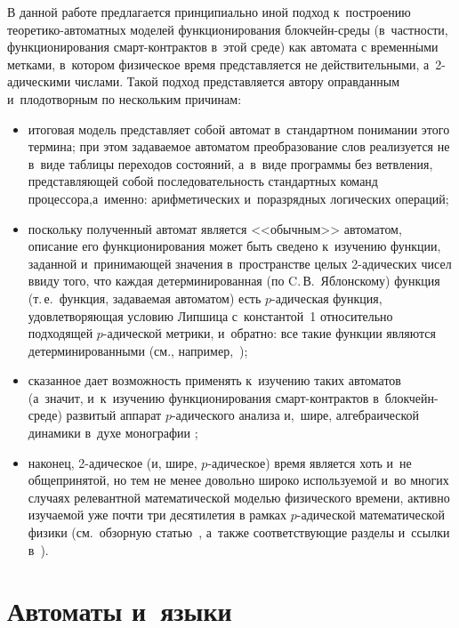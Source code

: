 \begin{multicols}{2}
 В данной работе
предлагается принципиально иной подход к~построению 
тео\-ре\-ти\-ко-ав\-то\-мат\-ных моделей  функционирования блок\-чейн-сре\-ды 
(в~частности,  функционирования
смарт-кон\-трак\-тов в~этой среде) как автомата
с временн$\acute{\mbox{ы}}$ми метками,  в~котором физическое время 
представляется не действительными, а~2-ади\-че\-ски\-ми числами.
Такой подход представляется автору оправданным и~плодотворным по
нескольким причинам:
\begin{itemize}
\item итоговая модель представляет собой автомат в~стандартном понимании
этого термина;
при этом задаваемое
автоматом преобразование слов  реализуется не в~виде таблицы переходов
состояний, а~в~виде программы без вет\-вле\-ния, пред\-став\-ля\-ющей собой
последовательность стандартных команд процессора,\linebreak а~именно:
арифметических и~поразрядных логических операций;
\item поскольку полученный автомат является <<обычным>> автоматом, описание
его функционирования может быть сведено к~изучению функции, заданной и~принимающей
значения в~пространстве целых 2-ади\-че\-ских чисел ввиду того, что каждая детерминированная
(по C.\,В.~Яблонскому)
функция (т.\,е.\ функция, задаваемая автоматом) есть
$p$-ади\-че\-ская функция,
удовлетворяющая  условию Липшица с~константой~1 относительно подходящей $p$-ади\-че\-ской
метрики, и~обратно: все такие функции являются детерминированными 
(см., например,~\cite{me:Discr_Syst});
\item сказанное дает возможность применять к~изуче\-нию таких автоматов
(а~значит, и~к~изуче\-нию функционирования смарт-кон\-трак\-тов в~блок\-чейн-сре\-де) 
развитый аппарат $p$-ади\-че\-ско\-го анализа и,~шире,
алгебраической динамики в~духе монографии \cite{AnKhr};
\item наконец, 2-ади\-че\-ское (и, шире, $p$-ади\-че\-ское) время является хоть 
и~не общепринятой, но тем не менее довольно широко используемой и~во многих случаях
релевантной математической моделью физического времени, активно изучаемой
уже почти три десятилетия
в рамках $p$-адической математической физики (см.\  обзорную статью~\cite{DraKhrenVol},
а~также соответствующие разделы
и~ссылки в~\cite{AnKhr}).
\end{itemize}




\section{Автоматы и~языки}


\end{multicols}
